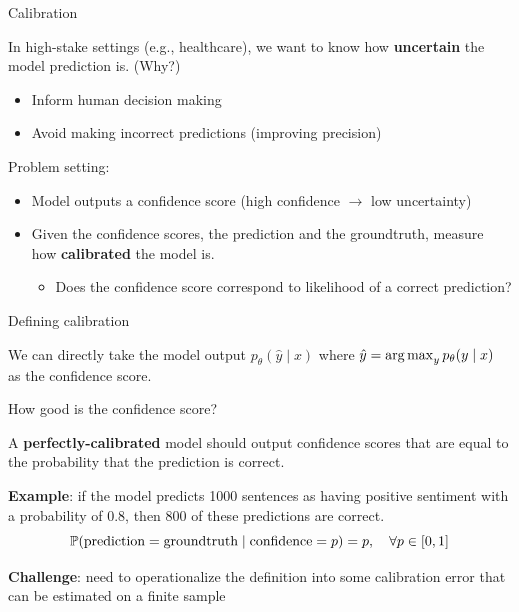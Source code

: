 \documentclass[usenames,dvipsnames,notes,11pt,aspectratio=169,hyperref={colorlinks=true, linkcolor=blue}]{beamer}
\begin{document}
\begin{frame}
    {Calibration}

    In high-stake settings (e.g., healthcare), we want to know how \textbf{uncertain} the model prediction is. (Why?) \\\pause
    \begin{itemize}
        \item Inform human decision making
        \item Avoid making incorrect predictions (improving precision)
    \end{itemize}

    \pause
    Problem setting:\\
    \begin{itemize}
        \item Model outputs a confidence score (high confidence $\rightarrow$ low uncertainty)
        \item Given the confidence scores, the prediction and the groundtruth, measure how \textbf{calibrated} the model is.
            \begin{itemize}
                \item Does the confidence score correspond to likelihood of a correct prediction?
            \end{itemize}
    \end{itemize}
\end{frame}

\begin{frame}
    {Defining calibration}

    We can directly take the model output $p_\theta(\hat{y}\mid x)$ where $\hat{y} = \operatorname*{arg\,max}_y p_\theta(y\mid x)$ as the confidence score.

    How good is the confidence score?\pause

    A \textbf{perfectly-calibrated} model should output confidence scores that are equal to the probability that the prediction is correct.

    \textbf{Example}: if the model predicts 1000 sentences as having positive sentiment with a probability of 0.8, then 800 of these predictions are correct.\pause
    $$
    \mathbb{P}(\text{prediction}=\text{groundtruth} \mid \text{confidence}=p) = p, \quad \forall p\in[0,1]
    $$

    \pause
    \textbf{Challenge}: need to operationalize the definition into some calibration error that can be estimated on a finite sample
\end{frame}
\end{document}
